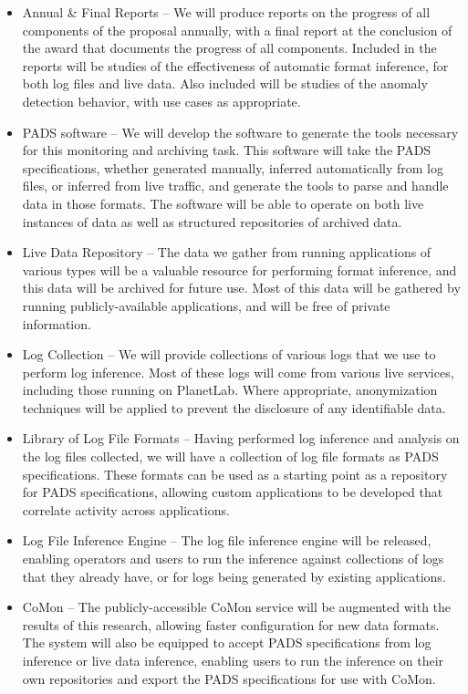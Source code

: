 \documentclass[12pt]{article}
\begin{document}
\begin{itemize}
\item Annual \& Final Reports -- We will produce reports on the
progress of all components of the proposal annually, with a final
report at the conclusion of the award that documents the progress of
all components. Included in the reports will be studies of the
effectiveness of automatic format inference, for both log files and
live data. Also included will be studies of the anomaly detection
behavior, with use cases as appropriate.

\item PADS software -- We will develop the software to generate the
tools necessary for this monitoring and archiving task. This software
will take the PADS specifications, whether generated manually,
inferred automatically from log files, or inferred from live traffic,
and generate the tools to parse and handle data in those formats. The
software will be able to operate on both live instances of data as
well as structured repositories of archived data.

\item Live Data Repository -- The data we gather from running
applications of various types will be a valuable resource for
performing format inference, and this data will be archived for future
use. Most of this data will be gathered by running
publicly-available applications, and will be free of private
information.

\item Log Collection -- We will provide collections of various logs
that we use to perform log inference. Most of these logs will come
from various live services, including those running on PlanetLab.
Where appropriate, anonymization techniques will be applied to
prevent the disclosure of any identifiable data.

\item Library of Log File Formats -- Having performed log inference
and analysis on the log files collected, we will have a collection of
log file formats as PADS specifications. These formats can be used as
a starting point as a repository for PADS specifications, allowing
custom applications to be developed that correlate activity across
applications.

\item Log File Inference Engine -- The log file inference engine will
be released, enabling operators and users to run the inference against
collections of logs that they already have, or for logs being
generated by existing applications.

\item CoMon -- The publicly-accessible CoMon service will be
augmented with the results of this research, allowing faster
configuration for new data formats. The system will also be equipped
to accept PADS specifications from log inference or live data
inference, enabling users to run the inference on their own
repositories and export the PADS specifications for use with CoMon.

\end{itemize}
\end{document}
